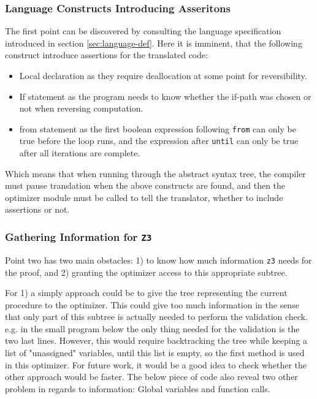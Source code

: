 \subsubsection{Language Constructs Introducing Asseritons}
The first point can be discovered by consulting the language specification introduced
in section \ref{sec:language-def}. Here it is imminent, that the following construct introduce
assertions for the translated code:
\begin{itemize} %
    \item Local declaration as they require deallocation at some point for reversibility.
    \item If statement as the program needs to know whether the if-path was chosen or not when
          reversing computation.
    \item from statement as the first boolean expression following \texttt{from} can only be true
          before the loop runs, and the expression after \texttt{until} can only be true after
          all iterations are complete.
\end{itemize}
\noindent
Which means that when running through the abstract syntax tree, the compiler must pause translation
when the above constructs are found, and then the optimizer module must be called to tell
the translator, whether to include assertions or not.

\subsubsection{Gathering Information for \texttt{Z3}}
Point two has two main obstacles: 1) to know how much information \texttt{z3} needs for the proof,
and 2) granting the optimizer access to this appropriate subtree.

For 1) a simply approach could be to give the tree representing the current procedure to the
optimizer. This could give too much information in the sense that only part of this subtree is
actually needed to perform the validation check. e.g. in the small program below the only thing
needed for the validation is the two last lines. However, this would require backtracking the
tree while keeping a list of "unassigned" variables, until this list is empty, so the first
method is used in this optimizer. For future work, it would be a good idea to check whether the
other approach would be faster. The below piece of code also reveal two other problem in regards
to information: Global variables and function calls.


